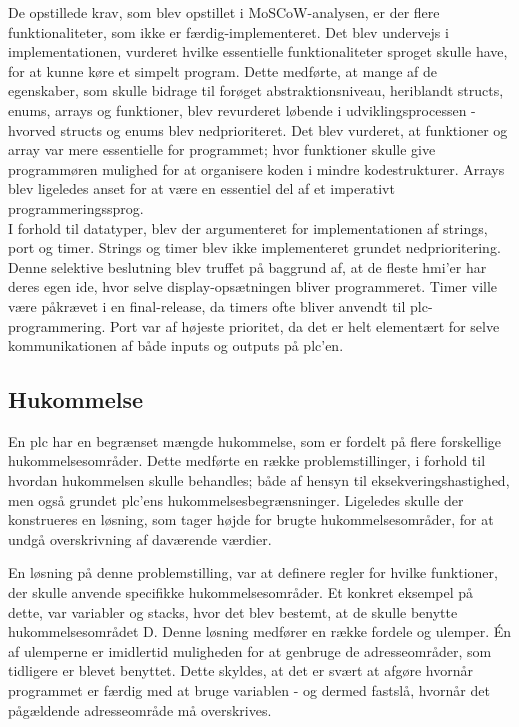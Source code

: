 \noindent De opstillede krav, som blev opstillet i MoSCoW-analysen, er der flere funktionaliteter, som ikke er færdig-implementeret. Det blev undervejs i implementationen, vurderet hvilke essentielle funktionaliteter sproget skulle have, for at kunne køre et simpelt program. Dette medførte, at mange af de egenskaber, som skulle bidrage til forøget abstraktionsniveau, heriblandt structs, enums, arrays og funktioner, blev revurderet løbende i udviklingsprocessen - hvorved structs og enums blev nedprioriteret. Det blev vurderet, at funktioner og array var mere essentielle for programmet; hvor funktioner skulle give programmøren mulighed for at organisere koden i mindre kodestrukturer. Arrays blev ligeledes anset for at være en essentiel del af et imperativt programmeringssprog. \\

\noindent I forhold til datatyper, blev der argumenteret for implementationen af strings, port og timer. Strings og timer blev ikke implementeret grundet nedprioritering. Denne selektive beslutning blev truffet på baggrund af, at de fleste \gls{hmi}'er har deres egen \gls{ide}, hvor selve display-opsætningen bliver programmeret. Timer ville være påkrævet i en final-release, da timers ofte bliver anvendt til \gls{plc}-programmering. 
Port var af højeste prioritet, da det er helt elementært for selve kommunikationen af både inputs og outputs på \gls{plc}'en. 

\subsection*{Hukommelse}
En \gls{plc} har en begrænset mængde hukommelse, som er fordelt på flere forskellige hukommelsesområder. 
Dette medførte en række problemstillinger, i forhold til hvordan hukommelsen skulle behandles; både af hensyn til eksekveringshastighed, men også grundet \gls{plc}'ens hukommelsesbegrænsninger. Ligeledes skulle der konstrueres en løsning, som tager højde for brugte hukommelsesområder, for at undgå overskrivning af daværende værdier. 

En løsning på denne problemstilling, var at definere regler for hvilke funktioner, der skulle anvende specifikke hukommelsesområder. Et konkret eksempel på dette, var variabler og stacks, hvor det blev bestemt, at de skulle benytte hukommelsesområdet D. 
Denne løsning medfører en række fordele og ulemper. Én af ulemperne er imidlertid muligheden for at genbruge de adresseområder, som tidligere er blevet benyttet. Dette skyldes, at det er svært at afgøre hvornår programmet er færdig med at bruge variablen - og dermed fastslå, hvornår det pågældende adresseområde må overskrives. \\

